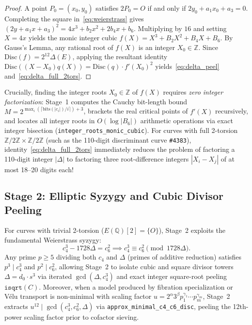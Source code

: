 \documentclass[10pt,a4paper]{article}
\theoremstyle{plain}
\theoremstyle{definition}
\theoremstyle{remark}
\begin{document}
\begin{proof}
A point $P_0 = (x_0, y_0)$ satisfies $2P_0 = O$ if and only if $2y_0 + a_1 x_0 + a_3 = 0$. Completing the square in~\eqref{eq:weierstrass} gives $(2y + a_1 x + a_3)^2 = 4x^3 + b_2 x^2 + 2b_4 x + b_6$. Multiplying by $16$ and setting $X = 4x$ yields the monic integer cubic $f(X) = X^3 + B_2 X^2 + B_4 X + B_6$. By Gauss's Lemma, any rational root of $f(X)$ is an integer $X_0 \in \mathbb{Z}$. Since $\mathrm{Disc}(f) = 2^{12} \Delta(E)$, applying the resultant identity $\mathrm{Disc}((X - X_0)q(X)) = \mathrm{Disc}(q) \cdot f'(X_0)^2$ yields~\eqref{eq:delta_peel} and~\eqref{eq:delta_full_2tors}.
\end{proof}

Crucially, finding the integer roots $X_0 \in \mathbb{Z}$ of $f(X)$ requires \emph{zero integer factorization}: Stage~1 computes the Cauchy bit-length bound $M = 2^{\max_i(\lceil\mathrm{bits}(|c_i|)/i\rceil) + 3}$, brackets the real critical points of $f'(X)$ recursively, and locates all integer roots in $O(\log |B_6|)$ arithmetic operations via exact integer bisection (\texttt{integer\_roots\_monic\_cubic}). For curves with full 2-torsion $\mathbb{Z}/2\mathbb{Z} \times \mathbb{Z}/2\mathbb{Z}$ (such as the 110-digit discriminant curve \texttt{\#4383}), identity~\eqref{eq:delta_full_2tors} immediately reduces the problem of factoring a 110-digit integer $|\Delta|$ to factoring three root-difference integers $|X_i - X_j|$ of at most 18--20 digits each!

\subsection{Stage 2: Elliptic Syzygy and Cubic Divisor Peeling}

For curves with trivial 2-torsion ($E(\mathbb{Q})[2] = \{O\}$), Stage~2 exploits the fundamental Weierstrass syzygy:
\begin{equation}
c_4^3 - 1728 \Delta = c_6^2 \implies c_4^3 \equiv c_6^2 \pmod{1728 \Delta}.
\end{equation}
Any prime $p \ge 5$ dividing both $c_4$ and $\Delta$ (primes of additive reduction) satisfies $p^3 \mid c_4^3$ and $p^2 \mid c_6^2$, allowing Stage~2 to isolate cubic and square divisor towers $\Delta = d_0 \cdot s^3$ via iterated $\gcd(\Delta, c_4^3)$ and exact integer square-root peeling $\mathtt{isqrt}(C)$. Moreover, when a model produced by fibration specialization or V\'{e}lu transport is non-minimal with scaling factor $u = 2^\alpha 3^\beta p_1^{\gamma_1} \cdots p_m^{\gamma_m}$, Stage~2 extracts $u^{12} \mid \gcd(c_4^3, c_6^2, \Delta)$ via \texttt{approx\_minimal\_c4\_c6\_disc}, peeling the 12th-power scaling factor prior to cofactor sieving.
\end{document}
